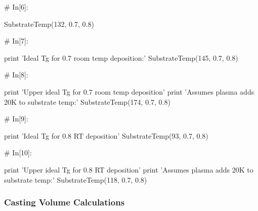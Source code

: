 \documentclass[a4paper,8pt]{article}
\begin{document}
\begin{python}
# In[6]:

SubstrateTemp(132, 0.7, 0.8)


# In[7]:

print 'Ideal Tg for 0.7 room temp deposition:'
SubstrateTemp(145, 0.7, 0.8)


# In[8]:

print 'Upper ideal Tg for 0.7 room temp deposition'
print 'Assumes plasma adds 20K to substrate temp:'
SubstrateTemp(174, 0.7, 0.8)


# In[9]:

print 'Ideal Tg for 0.8 RT deposition'
SubstrateTemp(93, 0.7, 0.8)


# In[10]:

print 'Upper ideal Tg for 0.8 RT deposition'
print 'Assumes plasma adds 20K to substrate temp:'
SubstrateTemp(118, 0.7, 0.8)

\end{python}

\newpage
\subsubsection{Casting Volume Calculations}
\end{document}
